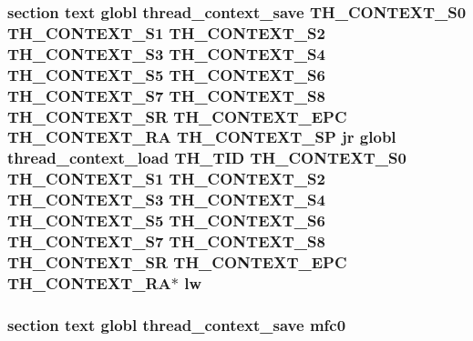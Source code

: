 \hypertarget{mips_2threada_8S_ac3d07703ce71c22ebb4fcb7c9e9ccc9f}{
\subsubsection[{lw}]{\setlength{\rightskip}{0pt plus 5cm}section text globl {\bf thread\-\_\-context\-\_\-save} {\bf T\-H\-\_\-\-C\-O\-N\-T\-E\-X\-T\-\_\-\-S0} {\bf T\-H\-\_\-\-C\-O\-N\-T\-E\-X\-T\-\_\-\-S1} {\bf T\-H\-\_\-\-C\-O\-N\-T\-E\-X\-T\-\_\-\-S2} {\bf T\-H\-\_\-\-C\-O\-N\-T\-E\-X\-T\-\_\-\-S3} {\bf T\-H\-\_\-\-C\-O\-N\-T\-E\-X\-T\-\_\-\-S4} {\bf T\-H\-\_\-\-C\-O\-N\-T\-E\-X\-T\-\_\-\-S5} {\bf T\-H\-\_\-\-C\-O\-N\-T\-E\-X\-T\-\_\-\-S6} {\bf T\-H\-\_\-\-C\-O\-N\-T\-E\-X\-T\-\_\-\-S7} {\bf T\-H\-\_\-\-C\-O\-N\-T\-E\-X\-T\-\_\-\-S8} {\bf T\-H\-\_\-\-C\-O\-N\-T\-E\-X\-T\-\_\-\-S\-R} {\bf T\-H\-\_\-\-C\-O\-N\-T\-E\-X\-T\-\_\-\-E\-P\-C} {\bf T\-H\-\_\-\-C\-O\-N\-T\-E\-X\-T\-\_\-\-R\-A} {\bf T\-H\-\_\-\-C\-O\-N\-T\-E\-X\-T\-\_\-\-S\-P} jr globl {\bf thread\-\_\-context\-\_\-load} {\bf T\-H\-\_\-\-T\-I\-D} {\bf T\-H\-\_\-\-C\-O\-N\-T\-E\-X\-T\-\_\-\-S0} {\bf T\-H\-\_\-\-C\-O\-N\-T\-E\-X\-T\-\_\-\-S1} {\bf T\-H\-\_\-\-C\-O\-N\-T\-E\-X\-T\-\_\-\-S2} {\bf T\-H\-\_\-\-C\-O\-N\-T\-E\-X\-T\-\_\-\-S3} {\bf T\-H\-\_\-\-C\-O\-N\-T\-E\-X\-T\-\_\-\-S4} {\bf T\-H\-\_\-\-C\-O\-N\-T\-E\-X\-T\-\_\-\-S5} {\bf T\-H\-\_\-\-C\-O\-N\-T\-E\-X\-T\-\_\-\-S6} {\bf T\-H\-\_\-\-C\-O\-N\-T\-E\-X\-T\-\_\-\-S7} {\bf T\-H\-\_\-\-C\-O\-N\-T\-E\-X\-T\-\_\-\-S8} {\bf T\-H\-\_\-\-C\-O\-N\-T\-E\-X\-T\-\_\-\-S\-R} {\bf T\-H\-\_\-\-C\-O\-N\-T\-E\-X\-T\-\_\-\-E\-P\-C} {\bf T\-H\-\_\-\-C\-O\-N\-T\-E\-X\-T\-\_\-\-R\-A}$\ast$ lw}}\label{mips_2threada_8S_ac3d07703ce71c22ebb4fcb7c9e9ccc9f}
\hypertarget{mips_2threada_8S_a16d060c3cb1010ca7012096ec19ff51d}{
\subsubsection[{mfc0}]{\setlength{\rightskip}{0pt plus 5cm}section text globl {\bf thread\-\_\-context\-\_\-save} mfc0}}\label{mips_2threada_8S_a16d060c3cb1010ca7012096ec19ff51d}
